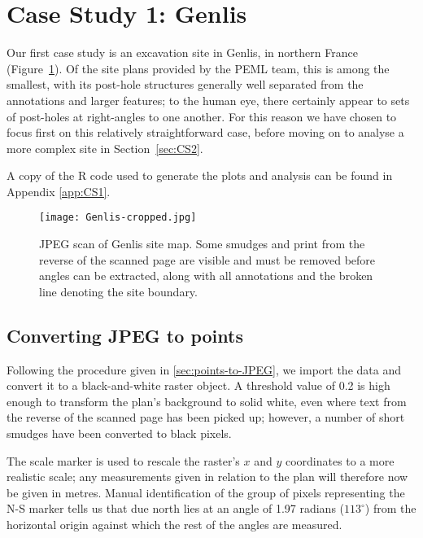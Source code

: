 \documentclass[../../ArchStats.tex]{subfiles}
\begin{document}
\section{Case Study 1: Genlis}
\label{sec:CS1}

Our first case study is an excavation site in Genlis, in northern France (Figure~\ref{fig:Genlis-JPEG}). Of the site plans provided by the PEML team, this is among the smallest, with its post-hole structures generally well separated from the annotations and larger features; to the human eye, there certainly appear to sets of post-holes at right-angles to one another. For this reason we have chosen to focus first on this relatively straightforward case, before moving on to analyse a more complex site in Section~\ref{sec:CS2}.

A copy of the R code used to generate the plots and analysis can be found in Appendix \ref{app:CS1}.

\begin{figure}[!h]
\label{fig:Genlis-JPEG}
\centering
\caption{JPEG scan of Genlis site map. Some smudges and print from the reverse of the scanned page are visible and must be removed before angles can be extracted, along with all annotations and the broken line denoting the site boundary.}
\texttt{[image: Genlis-cropped.jpg]}
\end{figure}


\subsection{Converting JPEG to points}

Following the procedure given in \ref{sec:points-to-JPEG}, we import the data and convert it to a black-and-white raster object. A threshold value of 0.2 is high enough to transform the plan's background to solid white, even where text from the reverse of the scanned page has been picked up; however, a number of short smudges have been converted to black pixels.

The scale marker is used to rescale the raster's $x$ and $y$ coordinates to a more realistic scale; any measurements given in relation to the plan will therefore now be given in metres. Manual identification of the group of pixels representing the N-S marker tells us that due north lies at an angle of 1.97 radians ($113^\circ$) from the horizontal origin against which the rest of the angles are measured.
\end{document}
